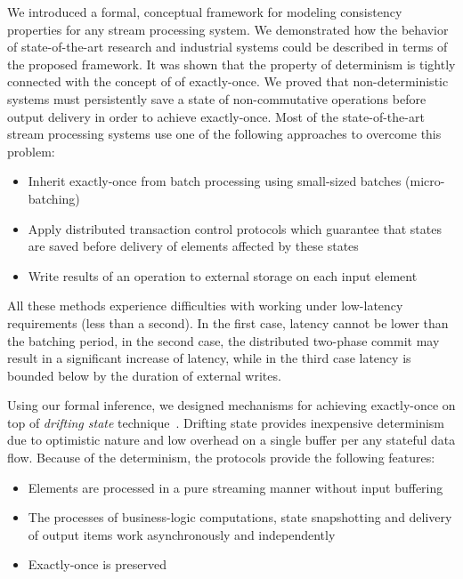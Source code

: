 
\label {fs-conclusion-seciton}

We introduced a formal, conceptual framework for modeling consistency properties for any stream processing system. We demonstrated how the behavior of state-of-the-art research and industrial systems could be described in terms of the proposed framework. It was shown that the property of determinism is tightly connected with the concept of of exactly-once. We proved that non-deterministic systems must persistently save a state of non-commutative operations before output delivery in order to achieve exactly-once. Most of the state-of-the-art stream processing systems use one of the following approaches to overcome this problem: 

\begin{itemize}
    \item Inherit exactly-once from batch processing using small-sized batches (micro-batching)
    \item Apply distributed transaction control protocols which guarantee that states are saved before delivery of elements affected by these states
    \item Write results of an operation to external storage on each input element
\end{itemize}

All these methods experience difficulties with working under low-latency requirements (less than a second). In the first case, latency cannot be lower than the batching period, in the second case, the distributed two-phase commit may result in a significant increase of latency, while in the third case latency is bounded below by the duration of external writes.

Using our formal inference, we designed mechanisms for achieving exactly-once on top of {\em drifting state} technique~\cite{we2018adbis}. Drifting state provides inexpensive determinism due to optimistic nature and low overhead on a single buffer per any stateful data flow. Because of the determinism, the protocols provide the following features:

\begin{itemize}
    \item Elements are processed in a pure streaming manner without input buffering
    \item The processes of business-logic computations, state snapshotting and delivery of output items work asynchronously and independently
    \item Exactly-once is preserved
\end{itemize}

